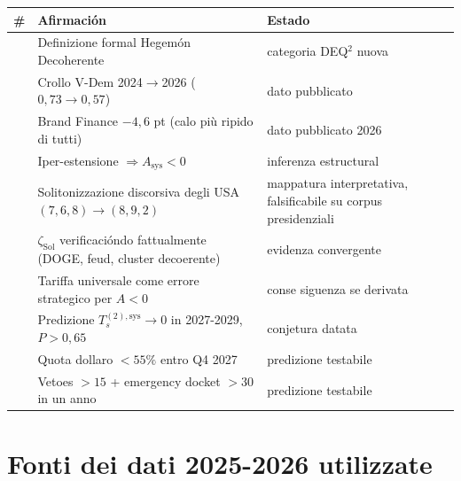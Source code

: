 {\def\LTcaptype{none} %
{\small\begin{longtable}[]{@{}
  >{\raggedright\arraybackslash}p{}
  >{\raggedright\arraybackslash}p{}
  >{\raggedright\arraybackslash}p{}@{}}
\toprule\noalign{}
\begin{minipage}[b]{\linewidth}\raggedright
\#
\end{minipage} & \begin{minipage}[b]{\linewidth}\raggedright
Afirmación
\end{minipage} & \begin{minipage}[b]{\linewidth}\raggedright
Estado
\end{minipage} \\
\midrule\noalign{}
\endhead
\bottomrule\noalign{}
\endlastfoot
1 & Definizione formal Hegemón Decoherente & \Hypoth{} categoria DEQ$^2$
nuova \\
2 & Crollo V-Dem 2024$\to$2026 (\(0{,}73 \to 0{,}57\)) & \Proved{} dato
pubblicato \\
3 & Brand Finance \(-4{,}6\) pt (calo più ripido di tutti) & \Proved{}
dato pubblicato 2026 \\
4 & Iper-estensione \(\Rightarrow A_{\text{sys}} < 0\) & \Hypoth{}
inferenza estructural \\
5 & Solitonizzazione discorsiva degli USA \((7,6,8) \to (8,9,2)\) &
\Conj{} mappatura interpretativa, falsificabile su corpus
presidenziali \\
6 & \(\zeta_{\text{Sol}}\) verificacióndo fattualmente (DOGE, feud, cluster
decoerente) & \Proved{} evidenza convergente \\
7 & Tariffa universale come errore strategico per \(A < 0\) & \Hypoth{}
conse siguenza se derivata \\
8 & Predizione \(T_s^{(2),\text{sys}} \to 0\) in 2027-2029,
\(P > 0{,}65\) & \Conj{} conjetura datata \\
9 & Quota dollaro \(< 55\%\) entro Q4 2027 & \Conj{} predizione
testabile \\
10 & Vetoes \(> 15\) + emergency docket \(> 30\) in un anno & \Conj{}
predizione testabile \\
\end{longtable}}
}



\section{Fonti dei dati 2025-2026
utilizzate}\label{fonti-dei-dati-2025-2026-utilizzate}

